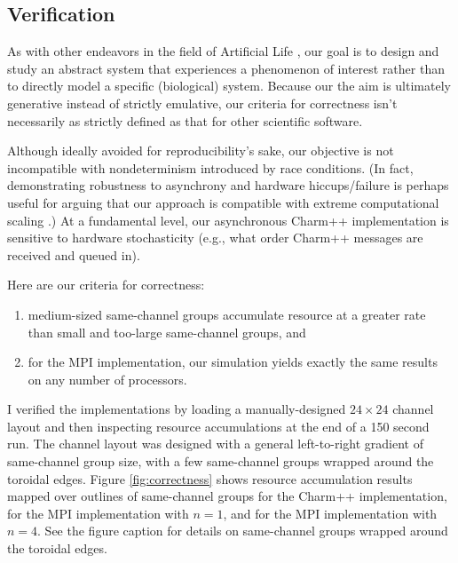 \subsection{Verification}



As with other endeavors in the field of Artificial Life \cite{bedau2000open}, our goal is to design and study an abstract system that experiences a phenomenon of interest rather than to directly model a specific (biological) system.
Because our the aim is ultimately generative instead of strictly emulative, our criteria for correctness isn't necessarily as strictly defined as that for other scientific software.

Although ideally avoided for reproducibility's sake, our objective is not incompatible with nondeterminism introduced by race conditions.
(In fact, demonstrating robustness to asynchrony and hardware hiccups/failure is perhaps useful for arguing that our approach is compatible with extreme computational scaling \cite{ackley2016indefinite}.)
At a fundamental level, our asynchronous Charm++ implementation is sensitive to hardware stochasticity (e.g., what order Charm++ messages are received and queued in).

Here are our criteria for correctness:
\begin{enumerate}
\item medium-sized same-channel groups accumulate resource at a greater rate than small and too-large same-channel groups, and
\item for the MPI implementation, our simulation yields exactly the same results on any number of processors.
\end{enumerate}

I verified the implementations by loading a manually-designed $24 \times 24$ channel layout and then inspecting resource accumulations at the end of a 150 second run.
The channel layout was designed with a general left-to-right gradient of same-channel group size, with a few same-channel groups wrapped around the toroidal edges.
Figure \ref{fig:correctness} shows resource accumulation results mapped over outlines of same-channel groups for the Charm++ implementation, for the MPI implementation with $n=1$, and for the MPI implementation with $n=4$.
See the figure caption for details on same-channel groups wrapped around the toroidal edges.

